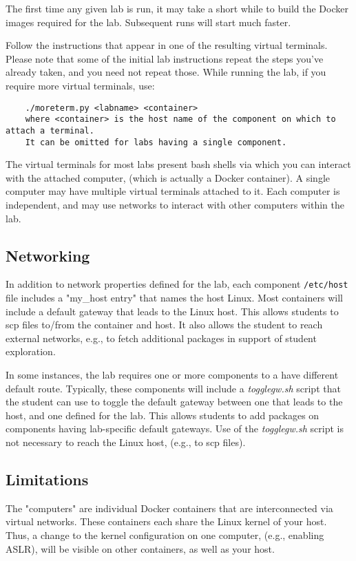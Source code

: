 \documentclass[12pt]{article}
\begin{document}
The first time any given lab is run, it may take a short while to build the Docker images 
required for the lab.  Subsequent runs will start much faster.

Follow the instructions that appear in one of the resulting virtual terminals.  Please
note that some of the initial lab instructions repeat the steps you've already taken, and you need
not repeat those.  While running the lab, if you require more virtual terminals, use:
\begin{verbatim}
    ./moreterm.py <labname> <container>
    where <container> is the host name of the component on which to attach a terminal.  
    It can be omitted for labs having a single component.
\end{verbatim}

The virtual terminals for most labs present bash shells via which you can interact
with the attached computer, (which is actually a Docker container).  A single computer
may have multiple virtual terminals attached to it.  Each computer is independent, and 
may use networks to interact with other computers within the lab.  

\subsection{Networking}
In addition to network properties defined for the lab,
each component \texttt{/etc/host} file includes a "my\_host entry" that names
the host Linux.  Most containers will include a default gateway that
leads to the Linux host.  This allows students to scp files to/from the container and host.
It also allows the student to reach external networks, e.g., to fetch additional packages in
support of student exploration.

In some instances, the lab requires one or more components to a have different default route.
Typically, these components will include a \textit{togglegw.sh} script that the student
can use to toggle the default gateway between one that leads to the host, and one defined for the lab.
This allows students to add packages on components having lab-specific default gateways.
Use of the \textit{togglegw.sh} script is not necessary to reach the Linux host, (e.g., to scp files).

\subsection{Limitations}
The "computers" are individual Docker containers that are interconnected via virtual
networks.  These containers each share the Linux kernel of your host.  Thus, a change
to the kernel configuration on one computer, (e.g., enabling ASLR), will be visible on
other containers, as well as your host.
\end{document}
